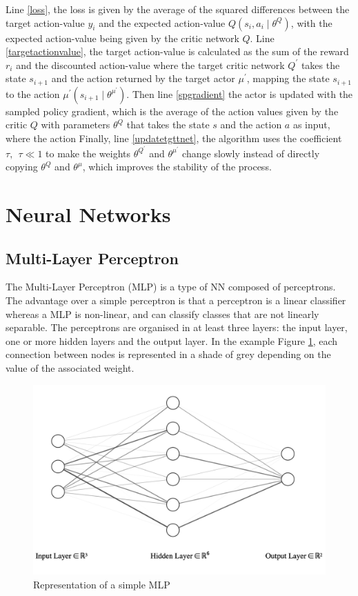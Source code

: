 Line \ref{loss}, the loss is given by the average of the squared differences between the target action-value $y_i$ and the expected action-value $Q\left(s_i,a_i \mid \theta^{Q}\right)$, with the expected action-value being given by the critic network $Q$. Line \ref{targetactionvalue}, the target action-value is calculated as the sum of the reward $r_i$ and the discounted action-value where the target critic network $Q^{'}$ takes the state $s_{i+1}$ and the action returned by the target actor $\mu^{'}$, mapping the state $s_{i+1}$ to the action $\mu^{'}\left(s_{i+1} \mid \theta^{\mu^{'}}\right)$. \newline
Then line \ref{spgradient} the actor is updated with the sampled policy gradient, which is the average of the action values given by the critic $Q$ with parameters $\theta^{Q}$ that takes the state $s$ and the action $a$ as input, where the action 
\newline
Finally, line \ref{updatetgttnet}, the algorithm uses the coefficient $\tau, \: \: \tau \ll 1$ to make the weights $\theta^{Q^{'}}$ and $\theta^{\mu^{'}}$ change slowly instead of directly copying $\theta^{Q}$ and $\theta^{\mu}$, which improves the stability of the process.


\section{Neural Networks}
\label{nns}
\subsection{Multi-Layer Perceptron}
\label{mlpsection}

The Multi-Layer Perceptron (MLP) is a type of NN composed of perceptrons. The advantage over a simple perceptron is that a perceptron is a linear classifier whereas a MLP is non-linear, and can classify classes that are not linearly separable. The perceptrons are organised in at least three layers: the input layer, one or more hidden layers and the output layer. In the example Figure \ref{mlp}, each connection between nodes is represented in a shade of grey depending on the value of the associated weight.

\begin{figure}[H]
\centering
\includegraphics[scale=0.3]{Figures/mlp.png}
\caption{Representation of a simple MLP}
\label{mlp}
\end{figure}

